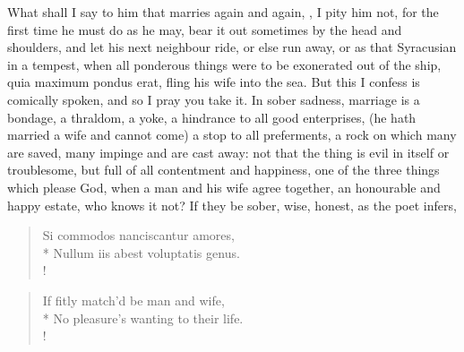What shall I say to him that marries again and again, , I pity him not, for the first time
he must do as he may, bear it out sometimes by the head and shoulders,
and let his next neighbour ride, or else run away, or as that
Syracusian in a tempest, when all ponderous things were to be
exonerated out of the ship, quia maximum pondus erat, fling his wife
into the sea. But this I confess is comically spoken, and so I
pray you take it. In sober sadness, marriage is a bondage, a
thraldom, a yoke, a hindrance to all good enterprises, (he hath married
a wife and cannot come) a stop to all preferments, a rock on which many
are saved, many impinge and are cast away: not that the thing is evil
in itself or troublesome, but full of all contentment and happiness,
one of the three things which please God,  when a man and his
wife agree together, an honourable and happy estate, who knows it not?
If they be sober, wise, honest, as the poet infers,
\begin{latin}%
\begin{verse}%
Si commodos nanciscantur amores,\\*
Nullum iis abest voluptatis genus.\\!
\end{verse}%
\end{latin}%
\translationrule%
\begin{verse}%
If fitly match'd be man and wife,\\*
No pleasure's wanting to their life.\\!
\end{verse}%
%

